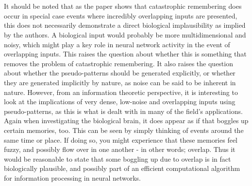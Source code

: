 \\\\
It should be noted that as the paper shows that catastrophic remembering does occur in special case events where incredibly overlapping inputs are presented, this does not necessarily demonstrate a direct biological implausibility as implied by the authors. A biological input would probably be more multidimensional and noisy, which might play a key role in neural network activity in the event of overlapping inputs. This raises the question about whether this is something that removes the problem of catastrophic remembering. It also raises the question about whether the pseudo-patterns should be generated explicitly, or whether they are generated implicitly by nature, as noise can be said to be inherent in nature. However, from an information theoretic perspective, it is interesting to look at the implications of very dense, low-noise and overlapping inputs using pseudo-patterns, as this is what is dealt with in many of the field's applications. Again when investigating the biological brain, it does appear as if that boggles up certain memories, too. This can be seen by simply thinking of events around the same time or place. If doing so, you might experience that these memories feel fuzzy, and possibly flow over in one another - in other words; overlap. Thus it would be reasonable to state that some boggling up due to overlap is in fact biologically plausible, and possibly part of an efficient computational algorithm for information processing in neural networks.

\cleardoublepage